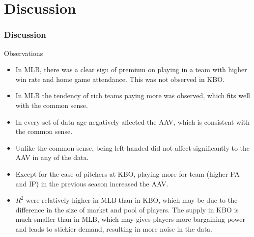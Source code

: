 \documentclass[9pt]{beamer}
\begin{document}
\section{Discussion}
\begin{frame}
    \frametitle{Discussion}
    \begin{block}{Observations}
        \begin{itemize}
            \item In MLB, there was a clear sign of premium on playing in a team with higher win rate and home game attendance. This was not observed in KBO.
            \item In MLB the tendency of rich teams paying more was observed, which fits well with the common sense.
            \item In every set of data age negatively affected the AAV, which is consistent with the common sense.
            \item Unlike the common sense, being left-handed did not affect significantly to the AAV in any of the data.
            \item Except for the case of pitchers at KBO, playing more for team (higher PA and IP) in the previous season increased the AAV.
            \item $R^2$ were relatively higher in MLB than in KBO, which may be due to the difference in the size of market and pool of players. The supply in KBO is much smaller than in MLB, which may gives players more bargaining power and leads to stickier demand, resulting in more noise in the data.
        \end{itemize}
    \end{block}
\end{frame}
\end{document}
